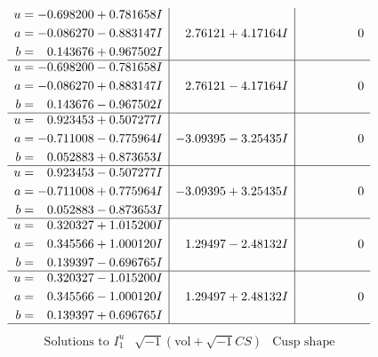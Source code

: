 \documentclass[1p]{elsarticle_modified}
\theoremstyle{definition}
\newcommand{\I}{\sqrt{-1}}
\begin{document}
$$\begin{array}{c|c|c}
\begin{aligned}
u &= -0.698200 + 0.781658 I \\
a &= -0.086270 - 0.883147 I \\
b &= \phantom{-}0.143676 + 0.967502 I\end{aligned}
 & \phantom{-}2.76121 + 4.17164 I & \phantom{-0.000000 } 0 \\ \hline\begin{aligned}
u &= -0.698200 - 0.781658 I \\
a &= -0.086270 + 0.883147 I \\
b &= \phantom{-}0.143676 - 0.967502 I\end{aligned}
 & \phantom{-}2.76121 - 4.17164 I & \phantom{-0.000000 } 0 \\ \hline\begin{aligned}
u &= \phantom{-}0.923453 + 0.507277 I \\
a &= -0.711008 - 0.775964 I \\
b &= \phantom{-}0.052883 + 0.873653 I\end{aligned}
 & -3.09395 - 3.25435 I & \phantom{-0.000000 } 0 \\ \hline\begin{aligned}
u &= \phantom{-}0.923453 - 0.507277 I \\
a &= -0.711008 + 0.775964 I \\
b &= \phantom{-}0.052883 - 0.873653 I\end{aligned}
 & -3.09395 + 3.25435 I & \phantom{-0.000000 } 0 \\ \hline\begin{aligned}
u &= \phantom{-}0.320327 + 1.015200 I \\
a &= \phantom{-}0.345566 + 1.000120 I \\
b &= \phantom{-}0.139397 - 0.696765 I\end{aligned}
 & \phantom{-}1.29497 - 2.48132 I & \phantom{-0.000000 } 0 \\ \hline\begin{aligned}
u &= \phantom{-}0.320327 - 1.015200 I \\
a &= \phantom{-}0.345566 - 1.000120 I \\
b &= \phantom{-}0.139397 + 0.696765 I\end{aligned}
 & \phantom{-}1.29497 + 2.48132 I & \phantom{-0.000000 } 0\\
 \hline 
 \end{array}$$\newpage$$\begin{array}{c|c|c}  
\text{Solutions to }I^u_{1}& \I (\text{vol} + \sqrt{-1}CS) & \text{Cusp shape}\\

\end{array}$$
\end{document}
